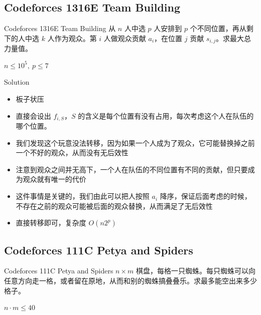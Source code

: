 ﻿\documentclass[aspectratio=169]{ctexbeamer}
\begin{document}
\subsection{Codeforces 1316E Team Building}
\begin{frame}{Codeforces 1316E Team Building}
    从 $n$ 人中选 $p$ 人安排到 $p$ 个不同位置，再从剩下的人中选 $k$ 人作为观众。第 $i$ 人做观众贡献 $a_i$，在位置 $j$ 贡献 $s_{i,j}$。求最大总力量值。
    
    $n\le 10^5,\ p\le 7$
\end{frame}

\begin{frame}{Solution}
    \begin{itemize}
        \item 板子状压
        \item 直接会设出 $f_{i,S}$，$S$ 的含义是每个位置有没有占用，每次考虑这个人在队伍的哪个位置。
        \item 我们发现这个玩意没法转移，因为如果一个人成为了观众，它可能替换掉之前一个不好的观众，从而没有无后效性
        \item 注意到观众之间并无高下，一个人在队伍的不同位置有不同的贡献，但只要成为观众就有唯一的代价
        \item 这件事情是关键的，我们由此可以把人按照 $a_i$ 降序，保证后面考虑的时候，不存在之前的观众可能被后面的观众替换，从而满足了无后效性
        \item 直接转移即可，复杂度 $O(n2^p)$
    \end{itemize}
\end{frame}









\subsection{Codeforces 111C Petya and Spiders}
\begin{frame}{Codeforces 111C Petya and Spiders}
    $n\times m$ 棋盘，每格一只蜘蛛。每只蜘蛛可以向任意方向走一格，或者留在原地，从而和别的蜘蛛搞叠叠乐。求最多能空出来多少格子。
    
    $n\cdot m\le 40$
\end{frame}
\end{document}
